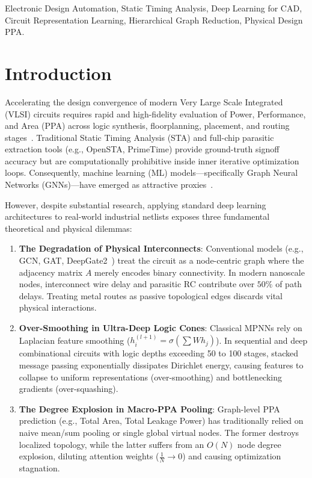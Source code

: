 \documentclass[conference]{IEEEtran}
\begin{document}
\begin{IEEEkeywords}
Electronic Design Automation, Static Timing Analysis, Deep Learning for CAD, Circuit Representation Learning, Hierarchical Graph Reduction, Physical Design PPA.
\end{IEEEkeywords}

\section{Introduction}
Accelerating the design convergence of modern Very Large Scale Integrated (VLSI) circuits requires rapid and high-fidelity evaluation of Power, Performance, and Area (PPA) across logic synthesis, floorplanning, placement, and routing stages~\cite{timingpredict, net2}. Traditional Static Timing Analysis (STA) and full-chip parasitic extraction tools (e.g., OpenSTA, PrimeTime) provide ground-truth signoff accuracy but are computationally prohibitive inside inner iterative optimization loops. Consequently, machine learning (ML) models—specifically Graph Neural Networks (GNNs)—have emerged as attractive proxies~\cite{deepgate2, preroutgnn}.

However, despite substantial research, applying standard deep learning architectures to real-world industrial netlists exposes three fundamental theoretical and physical dilemmas:

\begin{enumerate}
    \item \textbf{The Degradation of Physical Interconnects}: Conventional models (e.g., GCN, GAT, DeepGate2~\cite{deepgate2}) treat the circuit as a node-centric graph where the adjacency matrix $A$ merely encodes binary connectivity. In modern nanoscale nodes, interconnect wire delay and parasitic RC contribute over $50\%$ of path delays. Treating metal routes as passive topological edges discards vital physical interactions.
    \item \textbf{Over-Smoothing in Ultra-Deep Logic Cones}: Classical MPNNs rely on Laplacian feature smoothing ($h_i^{(l+1)} = \sigma(\sum W h_j)$). In sequential and deep combinational circuits with logic depths exceeding 50 to 100 stages, stacked message passing exponentially dissipates Dirichlet energy, causing features to collapse to uniform representations (over-smoothing) and bottlenecking gradients (over-squashing).
    \item \textbf{The Degree Explosion in Macro-PPA Pooling}: Graph-level PPA prediction (e.g., Total Area, Total Leakage Power) has traditionally relied on naive mean/sum pooling or single global virtual nodes. The former destroys localized topology, while the latter suffers from an $O(N)$ node degree explosion, diluting attention weights ($\frac{1}{N} \to 0$) and causing optimization stagnation.
\end{enumerate}
\end{document}
